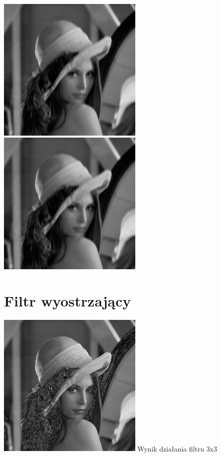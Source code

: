 \documentclass[a4paper,12pt,openany]{report}
\begin{document}
\begin{center}
\\
\\
\includegraphics[width=7cm]{resources/modified/lena/lena_blur_40x3.jpg}
\includegraphics[width=7cm]{resources/modified/lena/lena_blur_40x5.jpg}
\end{center}






\pagebreak
\section{Filtr wyostrzający}

\begin{center}
\includegraphics[width=7cm]{resources/modified/lena/lena_sharpen_3x3.jpg}
\linebreak
\tiny{Wynik działania filtru 3x3}
\end{center}
\end{document}
